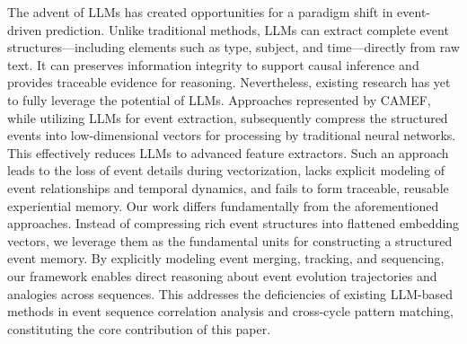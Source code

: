 \documentclass[sigconf, nonacm]{acmart} %
\begin{document}
The advent of LLMs has created opportunities for a paradigm shift in event-driven prediction. Unlike traditional methods, LLMs can extract complete event structures—including elements such as type, subject, and time—directly from raw text. It can preserves information integrity to support causal inference and provides traceable evidence for reasoning. 
Nevertheless, existing research has yet to fully leverage the potential of LLMs. Approaches represented by CAMEF\cite{zhang2025camef}, while utilizing LLMs for event extraction, subsequently compress the structured events into low-dimensional vectors for processing by traditional neural networks. This effectively reduces LLMs to advanced feature extractors. Such an approach leads to the loss of event details during vectorization, lacks explicit modeling of event relationships and temporal dynamics, and fails to form traceable, reusable experiential memory.
Our work differs fundamentally from the aforementioned approaches. Instead of compressing rich event structures into flattened embedding vectors, we leverage them as the fundamental units for constructing a structured event memory. By explicitly modeling event merging, tracking, and sequencing, our framework enables direct reasoning about event evolution trajectories and analogies across sequences. This addresses the deficiencies of existing LLM-based methods in event sequence correlation analysis and cross-cycle pattern matching, constituting the core contribution of this paper.
\end{document}
